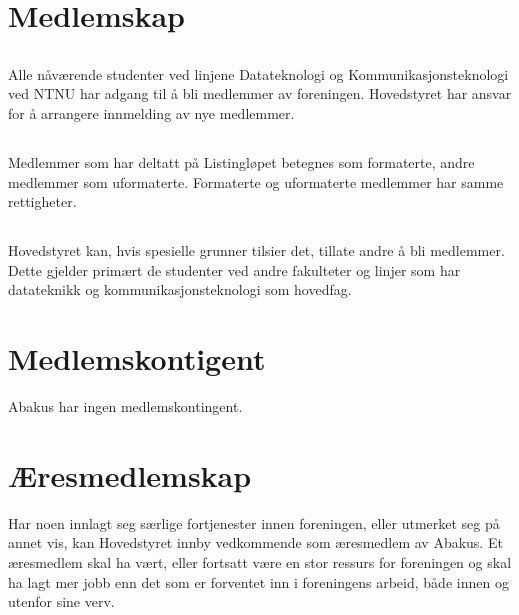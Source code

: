 \section{Medlemskap}

\subsection{}
Alle nåværende studenter ved linjene Datateknologi og Kommunikasjonsteknologi
ved NTNU har adgang til å bli medlemmer av foreningen. Hovedstyret har ansvar
for å arrangere innmelding av nye medlemmer.

\subsection{}
Medlemmer som har deltatt på Listingløpet betegnes som formaterte, andre
medlemmer som uformaterte. Formaterte og uformaterte medlemmer har samme
rettigheter.

\subsection{}
Hovedstyret kan, hvis spesielle grunner tilsier det, tillate andre å bli
medlemmer. Dette gjelder primært de studenter ved andre fakulteter og linjer
som har datateknikk og kommunikasjonsteknologi som hovedfag.

\section{Medlemskontigent}
Abakus har ingen medlemskontingent.

\section{Æresmedlemskap}
Har noen innlagt seg særlige fortjenester innen foreningen, eller utmerket seg
på annet vis, kan Hovedstyret innby vedkommende som æresmedlem av Abakus. Et
æresmedlem skal ha vært, eller fortsatt være en stor ressurs for foreningen og
skal ha lagt mer jobb enn det som er forventet inn i foreningens arbeid, både
innen og utenfor sine verv.


